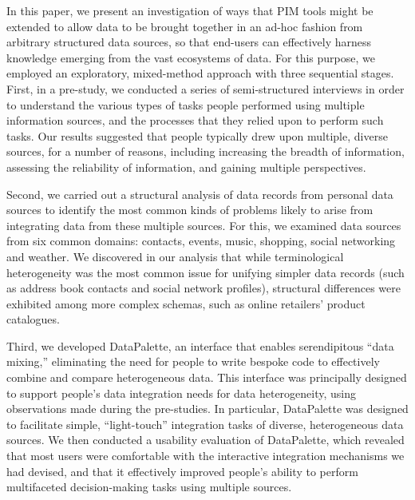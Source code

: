 \documentclass{sigchi}
\begin{document}
In this paper, we present an investigation of ways that PIM tools might be extended to allow data to be brought together in an ad-hoc fashion from arbitrary structured data sources, so that end-users can effectively harness knowledge emerging from the vast ecosystems of data.  For this purpose, we employed an exploratory, mixed-method approach with three sequential stages. First, in a pre-study, we conducted a series of semi-structured interviews in order to understand the various types of tasks people performed using multiple information sources, and the processes that they relied upon to perform such tasks.  Our results suggested that people typically drew upon multiple, diverse sources, for a number of reasons, including increasing the breadth of information, assessing the reliability of information, and gaining multiple perspectives.  


Second, we carried out a structural analysis of data records from personal data sources to identify the most common kinds of problems likely to arise from integrating data from these multiple sources.  For this, we examined data sources from six common domains: contacts, events, music, shopping, social networking and weather. We discovered in our analysis that while terminological heterogeneity was the most common issue for unifying simpler data records (such as address book contacts and social network profiles), structural differences were exhibited among more complex schemas, such as online retailers' product catalogues.

Third, we developed DataPalette, an interface that enables serendipitous ``data mixing,'' eliminating the need for people to write bespoke code to effectively combine and compare heterogeneous data.  This interface was principally designed to support people's data integration needs for data heterogeneity, using observations made during the pre-studies. In particular, DataPalette was designed to facilitate simple, ``light-touch'' integration tasks of diverse, heterogeneous data sources.  We then conducted a usability evaluation of DataPalette, which revealed that most users were comfortable with the interactive integration mechanisms we had devised, and that it effectively improved people's ability to perform multifaceted decision-making tasks using multiple sources.
\end{document}
